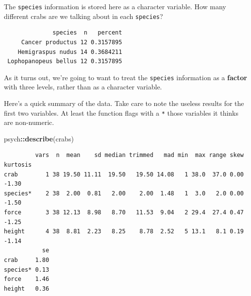 \documentclass[
]{book}
\newenvironment{Shaded}{\begin{snugshade}}{\end{snugshade}}
\newcommand{\DataTypeTok}[1]{\textcolor[rgb]{0.13,0.29,0.53}{#1}}
\newcommand{\KeywordTok}[1]{\textcolor[rgb]{0.13,0.29,0.53}{\textbf{#1}}}
\newcommand{\NormalTok}[1]{#1}
\newcommand{\OperatorTok}[1]{\textcolor[rgb]{0.81,0.36,0.00}{\textbf{#1}}}
\newcommand{\StringTok}[1]{\textcolor[rgb]{0.31,0.60,0.02}{#1}}
\begin{document}
The \texttt{species} information is stored here as a character variable. How many different crabs are we talking about in each \texttt{species}?

\begin{Shaded}
\end{Shaded}

\begin{verbatim}
              species  n   percent
     Cancer productus 12 0.3157895
    Hemigraspus nudus 14 0.3684211
 Lophopanopeus bellus 12 0.3157895
\end{verbatim}

As it turns out, we're going to want to treat the \texttt{species} information as a \textbf{factor} with three levels, rather than as a character variable.

\begin{Shaded}
\end{Shaded}

Here's a quick summary of the data. Take care to note the useless results for the first two variables. At least the function flags with a \texttt{*} those variables it thinks are non-numeric.

\begin{Shaded}
\begin{Highlighting}[]
\NormalTok{psych}\OperatorTok{::}\KeywordTok{describe}\NormalTok{(crabs)}
\end{Highlighting}
\end{Shaded}

\begin{verbatim}
         vars  n  mean    sd median trimmed   mad min  max range skew kurtosis
crab        1 38 19.50 11.11  19.50   19.50 14.08   1 38.0  37.0 0.00    -1.30
species*    2 38  2.00  0.81   2.00    2.00  1.48   1  3.0   2.0 0.00    -1.50
force       3 38 12.13  8.98   8.70   11.53  9.04   2 29.4  27.4 0.47    -1.25
height      4 38  8.81  2.23   8.25    8.78  2.52   5 13.1   8.1 0.19    -1.14
           se
crab     1.80
species* 0.13
force    1.46
height   0.36
\end{verbatim}
\end{document}
